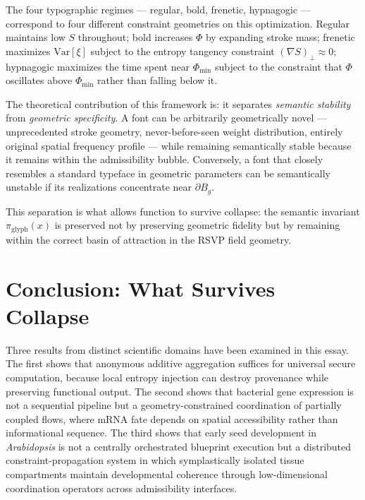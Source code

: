 \documentclass[12pt, a4paper]{article}
\theoremstyle{essaystyle}
\begin{document}
The four typographic regimes --- regular, bold, frenetic, hypnagogic --- correspond
to four different constraint geometries on this optimization. Regular maintains low $S$
throughout; bold increases $\Phi$ by expanding stroke mass; frenetic maximizes
$\mathrm{Var}[\xi]$ subject to the entropy tangency constraint
$(\nabla S)_\perp \approx 0$; hypnagogic maximizes the time spent near $\Phi_{\min}$
subject to the constraint that $\Phi$ oscillates above $\Phi_{\min}$ rather than
falling below it.

The theoretical contribution of this framework is: it separates \emph{semantic
stability} from \emph{geometric specificity}. A font can be arbitrarily geometrically
novel --- unprecedented stroke geometry, never-before-seen weight distribution, entirely
original spatial frequency profile --- while remaining semantically stable because it
remains within the admissibility bubble. Conversely, a font that closely resembles
a standard typeface in geometric parameters can be semantically unstable if its
realizations concentrate near $\partial B_g$.

This separation is what allows function to survive collapse: the semantic invariant
$\pi_{\mathrm{glyph}}(x)$ is preserved not by preserving geometric fidelity but by
remaining within the correct basin of attraction in the RSVP field geometry.

\section{Conclusion: What Survives Collapse}

Three results from distinct scientific domains have been examined in this essay.
The first shows that anonymous additive aggregation suffices for universal secure
computation, because local entropy injection can destroy provenance while preserving
functional output. The second shows that bacterial gene expression is not a sequential
pipeline but a geometry-constrained coordination of partially coupled flows, where mRNA
fate depends on spatial accessibility rather than informational sequence. The third
shows that early seed development in \textit{Arabidopsis} is not a centrally orchestrated
blueprint execution but a distributed constraint-propagation system in which symplastically
isolated tissue compartments maintain developmental coherence through low-dimensional
coordination operators across admissibility interfaces.
\end{document}
